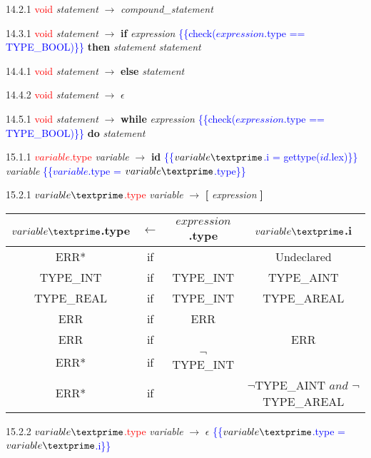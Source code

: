 \documentclass[10pt]{article}
\begin{document}
14.2.1 \textcolor{red}{void} \emph{statement} $\rightarrow$ \emph{compound\_statement}

14.3.1 \textcolor{red}{void} \emph{statement} $\rightarrow$ \textbf{if} \emph{expression} \textcolor{blue}{\{\{check($expression$.type == TYPE_BOOL)\}\}} \textbf{then} \emph{statement} \emph{statement\textprime}

14.4.1 \textcolor{red}{void} \emph{statement\textprime} $\rightarrow$ \textbf{else} \emph{statement}

14.4.2 \textcolor{red}{void} \emph{statement\textprime} $\rightarrow$ $\epsilon$

14.5.1 \textcolor{red}{void} \emph{statement} $\rightarrow$ \textbf{while} \emph{expression} \textcolor{blue}{\{\{check($expression$.type == TYPE_BOOL)\}\}} \textbf{do} \emph{statement}

15.1.1 \textcolor{red}{$variable$.type} \emph{variable} $\rightarrow$ \textbf{id} \textcolor{blue}{\{\{$variable\textprime$.i = gettype($id$.lex)\}\}} \emph{variable\textprime} \textcolor{blue}{\{\{$variable$.type = $variable\textprime$.type\}\}}

15.2.1 \textcolor{red}{$variable\textprime$.type} \emph{variable\textprime} $\rightarrow$ \textbf{[} \emph{expression} \textbf{]}

\begin{tabular}[t]{|c|c|c|c|}
  \hline

  $variable\textprime$.type & \textbf{$\leftarrow$} & $expression$.type & $variable\textprime$.i \\

  \hline

  ERR* & if & & Undeclared \\
  TYPE_INT & if & TYPE_INT & TYPE_AINT \\
  TYPE_REAL & if & TYPE_INT & TYPE_AREAL \\
  ERR & if & ERR & \\
  ERR & if & & ERR \\
  ERR* & if & $\neg$TYPE_INT & \\
  ERR* & if & & $\neg$TYPE_AINT $and$ $\neg$TYPE_AREAL \\

  \hline

\end{tabular}


15.2.2 \textcolor{red}{$variable\textprime$.type} \emph{variable\textprime} $\rightarrow$ $\epsilon$ \textcolor{blue}{\{\{$variable\textprime$.type = $variable\textprime$.i\}\}}
\end{document}
